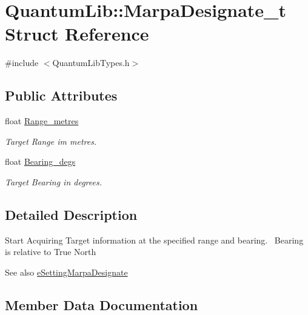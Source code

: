 \hypertarget{struct_quantum_lib_1_1_marpa_designate__t}{}\section{Quantum\+Lib\+:\+:Marpa\+Designate\+\_\+t Struct Reference}
\label{struct_quantum_lib_1_1_marpa_designate__t}


{\ttfamily \#include $<$Quantum\+Lib\+Types.\+h$>$}

\subsection*{Public Attributes}
\begin{DoxyCompactItemize}
\item 
float \mbox{\hyperlink{struct_quantum_lib_1_1_marpa_designate__t_a41a6e4f3a89b47f661f26758e35b918c}{Range\+\_\+metres}}
\begin{DoxyCompactList}\small\item\em Target Range im metres. \end{DoxyCompactList}\item 
float \mbox{\hyperlink{struct_quantum_lib_1_1_marpa_designate__t_a036c399c6516cb8700dbe836c3334f49}{Bearing\+\_\+degs}}
\begin{DoxyCompactList}\small\item\em Target Bearing in degrees. \end{DoxyCompactList}\end{DoxyCompactItemize}


\subsection{Detailed Description}
Start Acquiring Target information at the specified range and bearing.~\newline
Bearing is relative to True North \begin{DoxySeeAlso}{See also}
\mbox{\hyperlink{namespace_quantum_lib_acc8124e3e65bca4aa798d03a55e3d54ca6ebc12fe83f3f2c5c43089b20dfbaf56}{e\+Setting\+Marpa\+Designate}} 
\end{DoxySeeAlso}


\subsection{Member Data Documentation}
\mbox{\label{struct_quantum_lib_1_1_marpa_designate__t_a036c399c6516cb8700dbe836c3334f49}} 
